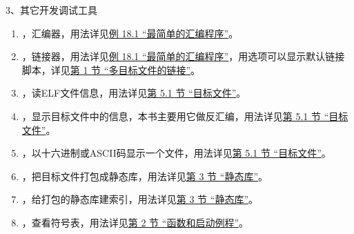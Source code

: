 3、其它开发调试工具


\begin{enumerate}

\item {}，汇编器，用法详见\hyperlink{db.ch18s01.id2769136}{例 18.\BookSplit{}1 “最简单的汇编程序”}。

\item {}，链接器，用法详见\hyperlink{db.ch18s01.id2769136}{例 18.\BookSplit{}1 “最简单的汇编程序”}，用选项可以显示默认链接脚本，详见\hyperlink{db.ch20s01.id2786161}{第 1 节 “多目标文件的链接”}。

\item {}，读ELF文件信息，用法详见\hyperlink{db.ch18s05.id2770854}{第 5.\BookSplit{}1 节 “目标文件”}。

\item {}，显示目标文件中的信息，本书主要用它做反汇编，用法详见\hyperlink{db.ch18s05.id2770854}{第 5.\BookSplit{}1 节 “目标文件”}。

\item {}，以十六进制或ASCII码显示一个文件，用法详见\hyperlink{db.ch18s05.id2770854}{第 5.\BookSplit{}1 节 “目标文件”}。

\item {}，把目标文件打包成静态库，用法详见\hyperlink{db.ch20s03.id2789183}{第 3 节 “静态库”}。

\item {}，给打包的静态库建索引，用法详见\hyperlink{db.ch20s03.id2789183}{第 3 节 “静态库”}。

\item {}，查看符号表，用法详见\hyperlink{db.ch19s02.id2776173}{第 2 节 “函数和启动例程”}。
\end{enumerate}

